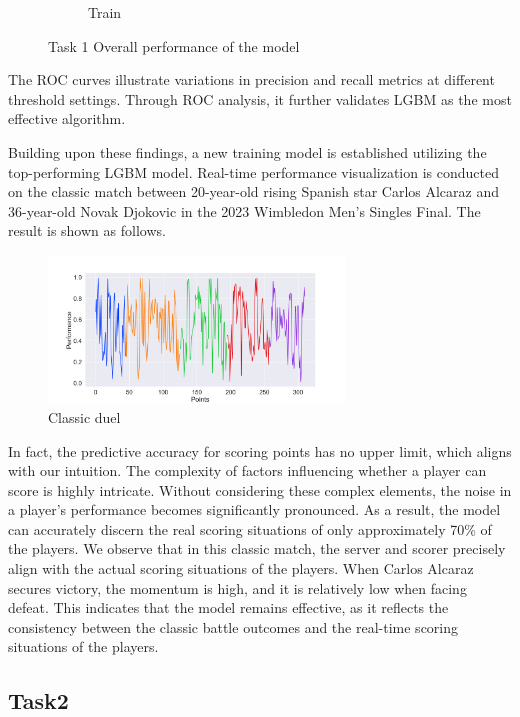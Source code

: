 \documentclass[12pt]{article}
\begin{document}
\begin{figure}[H]
\begin{subfigure}{0.48\textwidth}
          \caption{Train}
          \label{fig:roctrain}
      \end{subfigure}
      \caption{Task 1 Overall performance of the model}
      \label{fig:overall}
\end{figure}

The ROC curves illustrate variations in precision and recall metrics at different threshold settings. Through ROC analysis, it further validates LGBM as the most effective algorithm.

Building upon these findings, a new training model is established utilizing the top-performing LGBM model. Real-time performance visualization is conducted on the classic match between 20-year-old rising Spanish star Carlos Alcaraz and 36-year-old Novak Djokovic in the 2023 Wimbledon Men's Singles Final. The result is shown as follows.
\begin{figure}[H]
      \centering
      \includegraphics[width=0.7\textwidth]{classic_duel_trend.png}
      \caption{Classic duel}
\end{figure}

In fact, the predictive accuracy for scoring points has no upper limit, which aligns with our intuition. The complexity of factors influencing whether a player can score is highly intricate.
Without considering these complex elements, the noise in a player's performance becomes significantly pronounced. As a result, the model can accurately discern the real scoring situations of only approximately 70\%
of the players. We observe that in this classic match, the server and scorer precisely align with the actual scoring situations of the players. When Carlos Alcaraz secures victory, the momentum is high, and it is relatively low when facing defeat.
This indicates that the model remains effective, as it reflects the consistency between the classic battle outcomes and the real-time scoring situations of the players.
\subsection{Task2}
\end{document}

